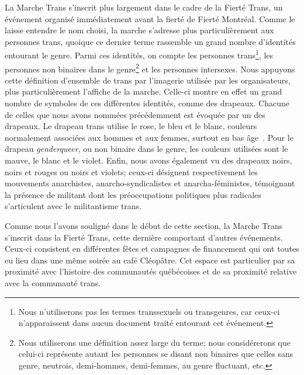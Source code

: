 La Marche Trans s'inscrit plus largement dans le cadre de la Fierté Trans, un événement organisé immédiatement avant la fierté de Fierté Montréal.
Comme le laisse entendre le nom choisi, la marche s'adresse plus particulièrement aux personnes trans, quoique ce dernier terme rassemble un grand nombre d'identités entourant le genre.
Parmi ces identités, on compte les personnes trans\footnote{Nous n'utiliserons pas les termes transsexuels ou transgenres, car ceux-ci n'apparaissent dans aucun document traité entourant cet événement.},
les personnes non binaires dans le genre\footnote{Nous utiliserons une définition assez large du terme; nous considérerons que celui-ci représente autant les personnes se disant non binaires que celles sans genre, neutrois, demi-hommes, demi-femmes, au genre fluctuant, etc.\citep[see][]{Barker2015}}
et les personnes intersexes.
Nous appuyons cette définition d'ensemble de trans par l'imagerie utilisée par les organisateurs, plus particulièrement l'affiche de la marche.
Celle-ci montre en effet un grand nombre de symboles de ces différentes identités, comme des drapeaux.
Chacune de celles que nous avons nommées précédemment est évoquée par un des drapeaux.
Le drapeau trans utilise le rose, le bleu et le blanc, couleurs normalement associées aux hommes et aux femmes, surtout en bas âge~\citep[quoique, selon les biens de consommation, ces couleurs sont souvent utilisées, surtout pour les produits féminins; voir][]{Koller2008}.
Pour le drapeau \emph{genderqueer}, ou non binaire dans le genre, les couleurs utilisées sont le mauve, le blanc et le violet.
Enfin, nous avons également vu des drapeaux noirs, noirs et rouges ou noirs et violets; ceux-ci désignent respectivement les mouvements anarchistes, anarcho-syndicalistes et anarcha-féministes, témoignant la présence de militant dont les préoccupations politiques plus radicales s'articulent avec le militantisme trans.

Comme nous l'avons souligné dans le début de cette section, la Marche Trans s'inscrit dans la Fierté Trans, cette dernière comportant d'autres événements.
Ceux-ci consistent en différentes fêtes et campagnes de financement qui ont toutes eu lieu dans une même soirée au café Cléopâtre.
Cet espace est particulier par sa proximité avec l'histoire des communautés \lgbt{} québécoises et de sa proximité relative avec la communauté trans.


